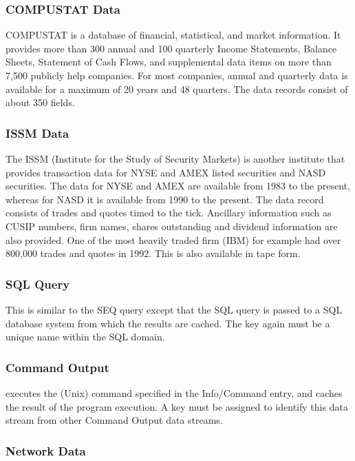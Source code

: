 \subsubsection{COMPUSTAT Data}

COMPUSTAT is a database of financial, statistical, and market
information. It provides more than 300 annual and 100 quarterly Income
Statements, Balance Sheets, Statement of Cash Flows, and supplemental
data items on more than 7,500 publicly help companies. For most
companies, annual and quarterly data is available for a maximum of 20
years and 48 quarters. The data records consist of about 350 fields.

\subsubsection{ISSM Data}

The ISSM (Institute for the Study of Security Markets) is another
institute that provides transaction data for NYSE and AMEX listed
securities and NASD securities. The data for NYSE and AMEX are
available from 1983 to the present, whereas for NASD it is available
from 1990 to the present. The data record consists of trades and
quotes timed to the tick. Ancillary information such as CUSIP numbers,
firm names, shares outstanding and dividend information are also
provided. One of the most heavily traded firm (IBM) for example had
over 800,000 trades and quotes in 1992. This is also available in tape
form.

\subsubsection{SQL Query}

This is similar to the SEQ query except that the SQL query is passed
to a SQL database system from which the results are cached. The key
again must be a unique name within the SQL domain.

\subsubsection{Command Output}

\Devise executes the (Unix) command specified in the Info/Command
entry, and caches the result of the program execution. A key must be
assigned to identify this data stream from other Command Output data
streams.

\subsubsection{Network Data}


